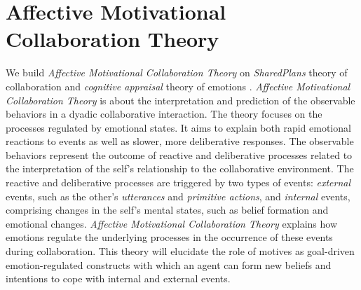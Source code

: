 \documentclass[letterpaper]{article}
\begin{document}
\section{Affective Motivational Collaboration Theory}

We build \textit{Affective Motivational Collaboration Theory} on
\textit{SharedPlans} theory of collaboration \cite{grosz:plans-discourse}
and \textit{cognitive appraisal} theory of emotions
\cite{gratch:domain-independent}. \textit{Affective Motivational Collaboration
Theory} is about the interpretation and prediction of the observable behaviors
in a dyadic collaborative interaction. The theory focuses on the processes
regulated by emotional states. It aims to explain both rapid emotional reactions
to events as well as slower, more deliberative responses. The observable
behaviors represent the outcome of reactive and deliberative processes related
to the interpretation of the self's relationship to the collaborative
environment. The reactive and deliberative processes are triggered by two types
of events: \textit{external} events, such as the other's \textit{utterances} and
\textit{primitive actions}, and \textit{internal} events, comprising changes in
the self's mental states, such as belief formation and emotional changes.
\textit{Affective Motivational Collaboration Theory} explains how emotions
regulate the underlying processes in the occurrence of these events during
collaboration. This theory will elucidate the role of motives as goal-driven
emotion-regulated constructs with which an agent can form new beliefs and
intentions to cope with internal and external events.
\end{document}
